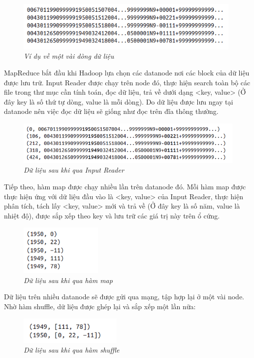 \documentclass[12pt]{report}
\begin{document}
\begin{figure}[H]
\centering
\includegraphics[width=11cm]{lines.png}
\caption{\it Ví dụ về một vài dòng dữ liệu}
\end{figure}

MapReduce bắt đầu khi Hadoop lựa chọn các datanode nơi các block của dữ liệu được lưu trữ.  Input Reader được chạy trên node đó, thực hiện search toàn bộ các file trong thư mục cần tính toán, đọc dữ liệu, trả về dưới dạng <key, value> (Ở đây key là số thứ tự dòng, value là mỗi dòng). Do dữ liệu được lưu ngay tại datanode nên việc đọc dữ liệu sẽ giống như đọc trên đĩa thông thường. 

\begin{figure}[H]
\centering
\includegraphics[width=14cm]{input_reader.png}
\caption{\it Dữ liệu sau khi qua Input Reader}
\end{figure}

Tiếp theo, hàm map được chạy nhiều lần trên datanode đó. Mỗi hàm map được thực hiện ứng với dữ liệu đầu vào là <key, value> của Input Reader, thực hiện phân tích, tách lấy <key, value> mới và trả về (Ở đây key là số năm, value là nhiệt độ), được sắp xếp theo key và lưu trữ các giá trị này trên ổ cứng.

\begin{figure}[H]
\centering
\includegraphics[width=4cm]{map.png}
\caption{\it Dữ liệu sau khi qua hàm map}
\end{figure}

Dữ liệu trên nhiều datanode sẽ được gửi qua mạng, tập hợp lại ở một vài node. Nhờ hàm shuffle, dữ liệu được ghép lại và sắp xếp một lần nữa:

\begin{figure}[H]
\centering
\includegraphics[width=5cm]{shuffle.png}
\caption{\it Dữ liệu sau khi qua hàm shuffle}
\end{figure}
\end{document}
